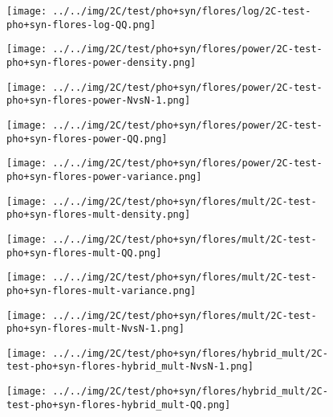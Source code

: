 \begin{figure}[H]
\centering	\texttt{[image: ../../img/2C/test/pho+syn/flores/log/2C-test-pho+syn-flores-log-QQ.png]}
\end{figure}
\begin{figure}[H]
\centering	\texttt{[image: ../../img/2C/test/pho+syn/flores/power/2C-test-pho+syn-flores-power-density.png]}
\end{figure}
\begin{figure}[H]
\centering	\texttt{[image: ../../img/2C/test/pho+syn/flores/power/2C-test-pho+syn-flores-power-NvsN-1.png]}
\end{figure}
\begin{figure}[H]
\centering	\texttt{[image: ../../img/2C/test/pho+syn/flores/power/2C-test-pho+syn-flores-power-QQ.png]}
\end{figure}
\begin{figure}[H]
\centering	\texttt{[image: ../../img/2C/test/pho+syn/flores/power/2C-test-pho+syn-flores-power-variance.png]}
\end{figure}
\begin{figure}[H]
\centering	\texttt{[image: ../../img/2C/test/pho+syn/flores/mult/2C-test-pho+syn-flores-mult-density.png]}
\end{figure}
\begin{figure}[H]
\centering	\texttt{[image: ../../img/2C/test/pho+syn/flores/mult/2C-test-pho+syn-flores-mult-QQ.png]}
\end{figure}
\begin{figure}[H]
\centering	\texttt{[image: ../../img/2C/test/pho+syn/flores/mult/2C-test-pho+syn-flores-mult-variance.png]}
\end{figure}
\begin{figure}[H]
\centering	\texttt{[image: ../../img/2C/test/pho+syn/flores/mult/2C-test-pho+syn-flores-mult-NvsN-1.png]}
\end{figure}
\begin{figure}[H]
\centering	\texttt{[image: ../../img/2C/test/pho+syn/flores/hybrid\_mult/2C-test-pho+syn-flores-hybrid\_mult-NvsN-1.png]}
\end{figure}
\begin{figure}[H]
\centering	\texttt{[image: ../../img/2C/test/pho+syn/flores/hybrid\_mult/2C-test-pho+syn-flores-hybrid\_mult-QQ.png]}
\end{figure}
